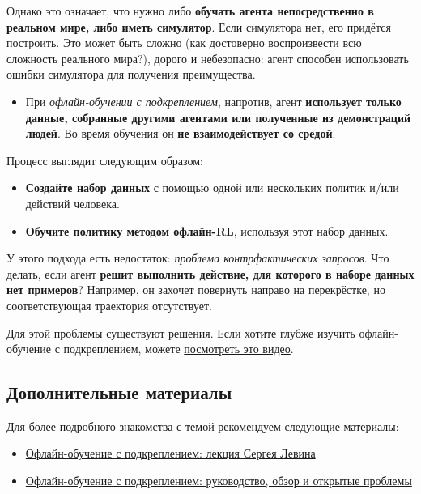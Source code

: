 \documentclass[11pt,a4paper]{article}
\begin{document}
Однако это означает, что нужно либо \textbf{обучать агента непосредственно в реальном мире, либо иметь симулятор}. Если симулятора нет, его придётся построить. Это может быть сложно (как достоверно воспроизвести всю сложность реального мира?), дорого и небезопасно: агент способен использовать ошибки симулятора для получения преимущества.

\begin{itemize}
\tightlist
\item
  При \emph{офлайн-обучении с подкреплением}, напротив, агент \textbf{использует только данные, собранные другими агентами или полученные из демонстраций людей}. Во время обучения он \textbf{не взаимодействует со средой}.
\end{itemize}

Процесс выглядит следующим образом:

\begin{itemize}
\item
  \textbf{Создайте набор данных} с помощью одной или нескольких политик и/или действий человека.
\item
  \textbf{Обучите политику методом офлайн-RL}, используя этот набор данных.
\end{itemize}

У этого подхода есть недостаток: \emph{проблема контрфактических запросов}. Что делать, если агент \textbf{решит выполнить действие, для которого в наборе данных нет примеров}? Например, он захочет повернуть направо на перекрёстке, но соответствующая траектория отсутствует.

Для этой проблемы существуют решения. Если хотите глубже изучить офлайн-обучение с подкреплением, можете \href{https://www.youtube.com/watch?v=k08N5a0gG0A}{посмотреть это видео}.

\subsection{Дополнительные материалы}\label{further-reading-2}

Для более подробного знакомства с темой рекомендуем следующие материалы:

\begin{itemize}
\item
  \href{https://www.youtube.com/watch?v=qgZPZREor5I}{Офлайн-обучение с подкреплением: лекция Сергея Левина}
\item
  \href{https://arxiv.org/abs/2005.01643}{Офлайн-обучение с подкреплением: руководство, обзор и открытые проблемы}
\end{itemize}
\end{document}
